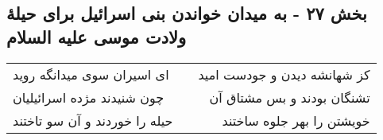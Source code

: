 \begin{center}
\section*{بخش ۲۷ - به میدان خواندن بنی اسرائیل برای  حیلهٔ ولادت موسی علیه السلام}
\label{sec:sh027}
\begin{longtable}{l p{0.5cm} r}
ای اسیران سوی میدانگه روید
&&
کز شهانشه دیدن و جودست امید
\\
چون شنیدند مژده اسرائیلیان
&&
تشنگان بودند و بس مشتاق آن
\\
حیله را خوردند و آن سو تاختند
&&
خویشتن را بهر جلوه ساختند
\\
\end{longtable}
\end{center}
